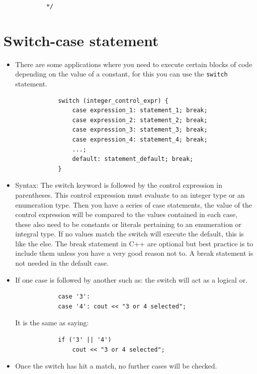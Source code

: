 \begin{itemize}
\begin{verbatim}
            */
        \end{verbatim}
\end{itemize}


\section{Switch-case statement}
\begin{itemize}
    \item There are some applications where you need to execute certain blocks of code depending on the value of a constant, for this you can use the \texttt{switch} statement.
        \begin{verbatim}
            switch (integer_control_expr) {
                case expression_1: statement_1; break;
                case expression_2: statement_2; break;
                case expression_3: statement_3; break;
                case expression_4: statement_4; break;
                ...;
                default: statement_default; break;
            }
        \end{verbatim}
    \item Syntax: The switch keyword is followed by the control expression in parentheses. This control expression must evaluate to an integer type or an enumeration type. Then you have a series of case statements, the value of the control expression will be compared to the values contained in each case, these also need to be constants or literals pertaining to an enumeration or integral type. If no values match the switch will execute the default, this is like the else. The break statement in C++ are optional but best practice is to include them unless you have a very good reason not to. A break statement is not needed in the default case.
    \item If one case is followed by another such as: the switch will act as a logical or.
        \begin{verbatim}
            case '3':
            case '4': cout << "3 or 4 selected";
        \end{verbatim}
        It is the same as saying:
        \begin{verbatim}
            if ('3' || '4') 
                cout << "3 or 4 selected";
        \end{verbatim}
    
    \item Once the switch has hit a match, no further cases will be checked.
\end{itemize}

